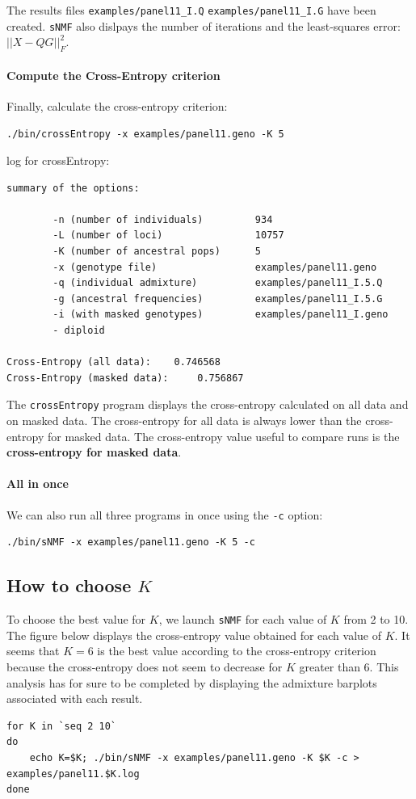 \documentclass[10pt,a4paper]{article}
\begin{document}
\noindent
The results files \verb|examples/panel11_I.Q| \verb|examples/panel11_I.G| have been created.
{\tt sNMF} also dislpays the number of iterations and the least-squares error: $||X - QG||_F^2$.

\paragraph{Compute the Cross-Entropy criterion}

Finally, calculate the cross-entropy criterion:
\begin{Verbatim}[frame=single]
./bin/crossEntropy -x examples/panel11.geno -K 5
\end{Verbatim}
\noindent
log for crossEntropy:
\begin{Verbatim}[frame=single]
summary of the options:

        -n (number of individuals)         934
        -L (number of loci)                10757
        -K (number of ancestral pops)      5
        -x (genotype file)                 examples/panel11.geno
        -q (individual admixture)          examples/panel11_I.5.Q
        -g (ancestral frequencies)         examples/panel11_I.5.G
        -i (with masked genotypes)         examples/panel11_I.geno
        - diploid

Cross-Entropy (all data):	 0.746568
Cross-Entropy (masked data):	 0.756867
\end{Verbatim}
\noindent
The {\tt crossEntropy} program displays the cross-entropy calculated on all data and on masked data.
The cross-entropy for all data is always lower than the cross-entropy for masked data. The cross-entropy value 
useful to compare runs is the {\bf cross-entropy for masked data}.


\paragraph{All in once}
We can also run all three programs in once using the \verb|-c| option:
\begin{Verbatim}[frame=single]
./bin/sNMF -x examples/panel11.geno -K 5 -c
\end{Verbatim}

\subsection{How to choose $K$}

To choose the best value for $K$, we launch {\tt sNMF} for each value of $K$ from 2 to 10. The figure below displays the cross-entropy value obtained for each value of $K$. It seems that $K=6$ is the best value according to the cross-entropy criterion because the cross-entropy does not seem to decrease for $K$ greater than 6. This analysis has for sure to be completed by displaying the admixture barplots associated with each result. 
\begin{Verbatim}[frame=single]
for K in `seq 2 10` 
do 
	echo K=$K; ./bin/sNMF -x examples/panel11.geno -K $K -c > examples/panel11.$K.log
done
\end{Verbatim}
\end{document}
